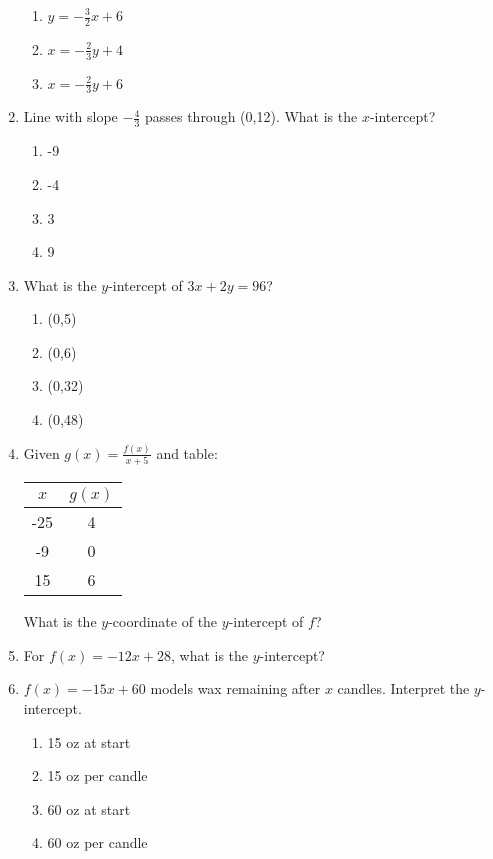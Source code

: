 \documentclass[12pt]{exam}
\begin{document}
\begin{enumerate}
\begin{enumerate}[label=\Alph*)]
        \item $y = -\frac{3}{2}x + 6$
        \item $x = -\frac{2}{3}y + 4$
        \item $x = -\frac{2}{3}y + 6$
    \end{enumerate}
    \item Line with slope $-\frac{4}{3}$ passes through (0,12). What is the $x$-intercept?
    \begin{enumerate}[label=\Alph*)]
        \item -9
        \item -4
        \item 3
        \item 9
    \end{enumerate}
    \item What is the $y$-intercept of $3x + 2y = 96$?
    \begin{enumerate}[label=\Alph*)]
        \item (0,5)
        \item (0,6)
        \item (0,32)
        \item (0,48)
    \end{enumerate}
    \item Given $g(x) = \frac{f(x)}{x + 5}$ and table:
    \begin{center}
        \begin{tabular}{|c|c|}
            \hline
            $x$ & $g(x)$ \\
            \hline
            -25 & 4 \\
            -9 & 0 \\
            15 & 6 \\
            \hline
        \end{tabular}
    \end{center}
    What is the $y$-coordinate of the $y$-intercept of $f$?
    \item For $f(x) = -12x + 28$, what is the $y$-intercept?
    \item $f(x) = -15x + 60$ models wax remaining after $x$ candles. Interpret the $y$-intercept.
    \begin{enumerate}[label=\Alph*)]
        \item 15 oz at start
        \item 15 oz per candle
        \item 60 oz at start
        \item 60 oz per candle

\end{enumerate}
\end{enumerate}
\end{document}
